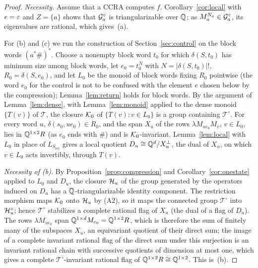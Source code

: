 \begin{proof}
\emph{Necessity.} Assume that a CCRA computes $f$. Corollary~\ref{cor:local} with $e=\varepsilon$ and $Z=\{a\}$ shows that $\mathcal{G}_a^\circ$ is triangularizable over $\mathbb{Q}$; as $M_a^{N_a}\in\mathcal{G}_a^\circ$, its eigenvalues are rational, which gives~(a).

For (b) and (c) we run the construction of Section~\ref{sec:control} on the block words $(a^*\#)^*$. Choose a nonempty block word $t_0$ for which $\delta(S,t_0)$ has minimum size among block words, let $e_0=t_0^{N}$ with $N=|\delta(S,t_0)|!$, $R_0=\delta(S,e_0)$, and let $L_0$ be the monoid of block words fixing $R_0$ pointwise (the word $e_0$ for the control is not to be confused with the element $e$ chosen below by the compression); Lemma~\ref{lem:return} holds for block words. By the argument of Lemma~\ref{lem:dense}, with Lemma~\ref{lem:monoid} applied to the dense monoid $\{T(v)\}$ of $\mathcal T$, the closure $\mathcal{K}_0$ of $\{T(v):v\in L_0\}$ is a group containing $\mathcal T^\circ$. For every word $u$, $\delta(s_0,ue_0)\in R_0$, and the span $X_u$ of the rows $\lambda M_{ue_0}M_v$, $v\in L_0$, lies in $\mathbb{Q}^{1\times2}R$ (as $e_0$ ends with $\#$) and is $\mathcal{K}_0$-invariant. Lemma~\ref{lem:local} with $L_0$ in place of $L_{S_{\mathrm{ret}}}$ gives a local quotient $D_u\cong\mathbb{Q}^d/X_u^\perp$, the dual of $X_u$, on which $v\in L_0$ acts invertibly, through $T(v)$.

\emph{Necessity of (b).} By Proposition~\ref{prop:compression} and Corollary~\ref{cor:onestate} applied to $L_0$ and $D_u$, the closure $\mathcal{H}_u$ of the group generated by the operators induced on $D_u$ has a $\mathbb{Q}$-triangularizable identity component. The restriction morphism maps $\mathcal{K}_0$ onto $\mathcal{H}_u$ by (A2), so it maps the connected group $\mathcal T^\circ$ into $\mathcal{H}_u^\circ$; hence $\mathcal T^\circ$ stabilizes a complete rational flag of $X_u$ (the dual of a flag of $D_u$). The rows $\lambda M_{ue_0}$ span $\mathbb{Q}^{1\times d}M_{e_0}=\mathbb{Q}^{1\times2}R$, which is therefore the sum of finitely many of the subspaces $X_u$, an equivariant quotient of their direct sum; the image of a complete invariant rational flag of the direct sum under this surjection is an invariant rational chain with successive quotients of dimension at most one, which gives a complete $\mathcal T^\circ$-invariant rational flag of $\mathbb{Q}^{1\times2}R\cong\mathbb{Q}^{1\times2}$. This is~(b).


\end{proof}
